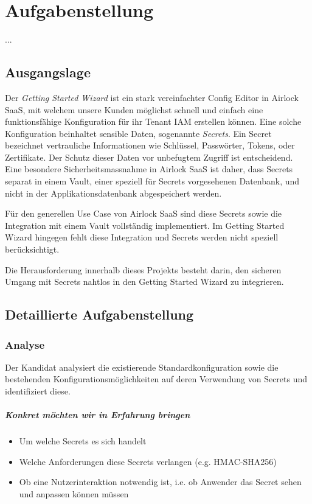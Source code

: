 \chapter{Aufgabenstellung}\label{ch:aufgabenstellung}
...


\section{Ausgangslage}\label{sec:ausgangslage}
Der \textit{Getting Started Wizard} ist ein stark vereinfachter Config Editor in Airlock SaaS, mit welchem unsere Kunden möglichst schnell und einfach eine funktionsfähige Konfiguration für ihr Tenant IAM erstellen können.
Eine solche Konfiguration beinhaltet sensible Daten, sogenannte \textit{Secrets}.
Ein Secret bezeichnet vertrauliche Informationen wie Schlüssel, Passwörter, Tokens, oder Zertifikate.
Der Schutz dieser Daten vor unbefugtem Zugriff ist entscheidend.
Eine besondere Sicherheitsmassnahme in Airlock SaaS ist daher, dass Secrets separat in einem Vault, einer speziell für Secrets vorgesehenen Datenbank, und nicht in der Applikationsdatenbank abgespeichert werden.

Für den generellen Use Case von Airlock SaaS sind diese Secrets sowie die Integration mit einem Vault vollständig implementiert.
Im Getting Started Wizard hingegen fehlt diese Integration und Secrets werden nicht speziell berücksichtigt.

Die Herausforderung innerhalb dieses Projekts besteht darin, den sicheren Umgang mit Secrets nahtlos in den Getting Started Wizard zu integrieren.

\section{Detaillierte Aufgabenstellung}\label{sec:detaillierte-aufgabenstellung}
\subsection{Analyse}\label{subsec:detailierte-aufgabenstellung-anayse}
Der Kandidat analysiert die existierende Standardkonfiguration sowie die bestehenden Konfigurationsmöglichkeiten auf deren Verwendung von Secrets und identifiziert diese.

\paragraph{Konkret möchten wir in Erfahrung bringen}
\begin{itemize}
    \item Um welche Secrets es sich handelt
    \item Welche Anforderungen diese Secrets verlangen (e.g. HMAC-SHA256)
    \item Ob eine Nutzerinteraktion notwendig ist, i.e. ob Anwender das Secret sehen und anpassen können müssen
\end{itemize}


